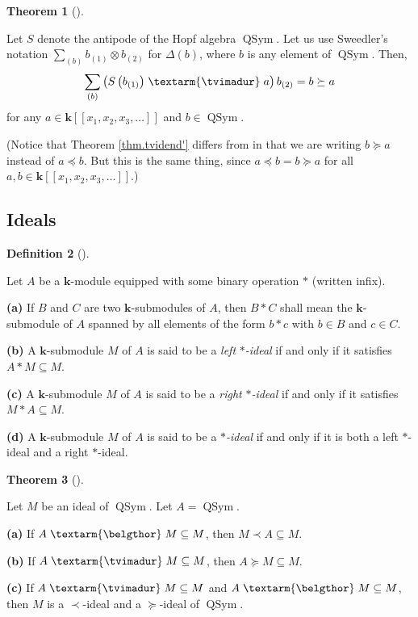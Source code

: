 \documentclass[numbers=enddot,12pt,final,onecolumn,notitlepage]{scrartcl}%
\theoremstyle{definition}
\newtheorem{theo}{Theorem}[section]
\newenvironment{theorem}[1][]
{\begin{theo}[#1]\begin{leftbar}}
{\end{leftbar}\end{theo}}
\newtheorem{defi}[theo]{Definition}
\newenvironment{definition}[1][]
{\begin{defi}[#1]\begin{leftbar}}
{\end{leftbar}\end{defi}}
\newcommand{\tvi}{\left. \textarm{\tvimadur} \right.}
\newcommand{\bel}{\left. \textarm{\belgthor} \right.}
\let\sumnonlimits\sum
\renewcommand{\sum}{\sumnonlimits\limits}
\begin{document}
\begin{theorem}
\label{thm.tvidend'}Let $S$ denote the antipode of the Hopf algebra
$\operatorname*{QSym}$. Let us use Sweedler's notation $\sum_{\left(
b\right)  }b_{\left(  1\right)  }\otimes b_{\left(  2\right)  }$ for
$\Delta\left(  b\right)  $, where $b$ is any element of $\operatorname*{QSym}%
$. Then,%
\[
\sum_{\left(  b\right)  }\left(  S\left(  b_{\left(  1\right)  }\right)
\tvi  a\right)  b_{\left(  2\right)  }=b\left.  \succeq\right.  a
\]
for any $a\in\mathbf{k}\left[  \left[  x_{1},x_{2},x_{3},\ldots\right]
\right]  $ and $b\in\operatorname*{QSym}$.
\end{theorem}

(Notice that Theorem \ref{thm.tvidend'} differs from \cite[detailed version,
Theorem 3.15]{dimcr} in that we are writing $b\left.  \succeq\right.  a$
instead of $a\left.  \preceq\right.  b$. But this is the same thing, since
$a\left.  \preceq\right.  b=b\left.  \succeq\right.  a$ for all $a,b\in
\mathbf{k}\left[  \left[  x_{1},x_{2},x_{3},\ldots\right]  \right]  $.)

\subsection{Ideals}

\begin{definition}
Let $A$ be a $\mathbf{k}$-module equipped with some binary operation $\ast$
(written infix).

\textbf{(a)} If $B$ and $C$ are two $\mathbf{k}$-submodules of $A$, then
$B\ast C$ shall mean the $\mathbf{k}$-submodule of $A$ spanned by all elements
of the form $b\ast c$ with $b\in B$ and $c\in C$.

\textbf{(b)} A $\mathbf{k}$-submodule $M$ of $A$ is said to be a \textit{left
}$\ast$\textit{-ideal} if and only if it satisfies $A\ast M\subseteq M$.

\textbf{(c)} A $\mathbf{k}$-submodule $M$ of $A$ is said to be a \textit{right
}$\ast$\textit{-ideal} if and only if it satisfies $M\ast A\subseteq M$.

\textbf{(d)} A $\mathbf{k}$-submodule $M$ of $A$ is said to be a\textit{
}$\ast$\textit{-ideal} if and only if it is both a left $\ast$-ideal and a
right $\ast$-ideal.
\end{definition}

\begin{theorem}
\label{thm.ideal-crit2}Let $M$ be an ideal of $\operatorname*{QSym}$. Let
$A=\operatorname*{QSym}$.

\textbf{(a)} If $A\bel  M\subseteq M$, then $M\left.  \prec\right.  A\subseteq
M$.

\textbf{(b)} If $A\tvi  M\subseteq M$, then $A\left.  \succeq\right.
M\subseteq M$.

\textbf{(c)} If $A\tvi  M\subseteq M$ and $A\bel  M\subseteq M$, then $M$ is a
$\left.  \prec\right.  $-ideal and a $\left.  \succeq\right.  $-ideal of
$\operatorname*{QSym}$.
\end{theorem}
\end{document}
